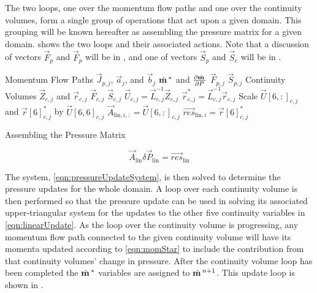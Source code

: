 The two loops, one over the momentum flow paths and one over the continuity volumes, form a single group of operations that act upon a given domain.
This grouping will be known hereafter as assembling the pressure matrix for a given domain.
 shows the two loops and their associated actions.
Note that a discussion of vectors $\vec{F}_{p}$ and $\vec{F}_{p}$ will be in , and one of vectors $\vec{S}_{p}$ and $\vec{S}_{c}$ will be in .

\begin{algo}[ht!]
\setlength{\baselineskip}{0.625\baselineskip}
\begin{algorithmic}[1]
\Loop \; Momentum Flow Paths
	\Calculate $\vec{J}_{p, j}$, $\vec{a}_{j}$, and $\vec{b}_{j}$
	\Calculate $\momVec{}^{*}$ and $\frac{\partial \momVec{}}{\partial P}$
	\Calculate $\vec{F}_{p, j}$	
	\Calculate $\vec{S}_{p, j}$	
\EndLoop
\Loop \; Continuity Volumes
   	\Calculate $\vec{Z}_{c,j}$ and $\vec{r}_{c, j}$
 	\Calculate $\vec{F}_{c, j}$	
	\Calculate $\vec{S}_{c, j}$	
   	\Calculate $\vec{U}_{c, j} = \vec{L}_{c, j}^{-1} \vec{Z}_{c, j}$
   	\Calculate $\vec{r}^{*}_{c, j} = \vec{L}_{c, j}^{-1} \vec{r}_{c, j}$
   	\Set Scale $\vec{U}[6, :]_{c, j}$ and $\vec{r}[6]^{*}_{c, j}$ by $\vec{U}[6,6]_{c, j}$
   	\Set $\vec{A}_{\text{lin},i, :} = \vec{U}[6,:]_{c, j}$
   	\Set $\vec{res}_{\text{lin},i} = \vec{r}[6]^{*}_{c, j}$
\EndLoop
\end{algorithmic}
\caption{Assembling the Pressure Matrix}
\label{alg:xschem}
\end{algo}

\begin{equation}
\label{eqn:pressureUpdateSystem}
\vec{A}_{\text{lin}} \delta \vec{P}_{\text{lin}} = \vec{res}_{\text{lin}}
\end{equation}

The system, \eqref{eqn:pressureUpdateSystem}, is then solved to determine the pressure updates for the whole domain.
A loop over each continuity volume is then performed so that the pressure update can be used in solving its associated upper-triangular system for the updates to the other five continuity variables in \eqref{eqn:linearUpdate}.
As the loop over the continuity volume is progressing, any momentum flow path connected to the given continuity volume will have its momenta updated according to \eqref{eqn:momStar} to include the contribution from that continuity volumes' change in pressure. 
After the continuity volume loop has been completed the $\momVec{}^{*}$ variables are assigned to $\momVec{}^{n+1}$. 
This update loop is shown in .

